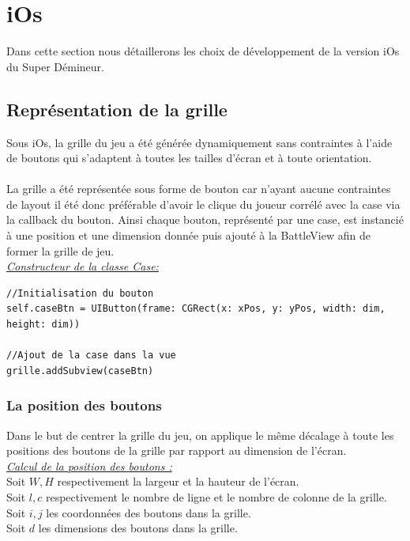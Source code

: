 \documentclass{article}
\begin{document}
\section{iOs}

Dans cette section nous détaillerons les choix de développement de la version iOs du Super Démineur. 

\subsection{Représentation de la grille}

Sous iOs, la grille du jeu a été générée dynamiquement sans contraintes à l'aide de boutons qui s'adaptent à toutes les tailles d'écran et à toute orientation. \\\\
La grille a été représentée sous forme de bouton car n'ayant aucune contraintes de layout il été donc préférable d'avoir le clique du joueur corrélé avec la case via la callback du bouton. 
Ainsi chaque bouton, représenté par une case, est instancié à une position et une dimension donnée puis ajouté à la BattleView afin de former la grille de jeu.\\

\noindent \underline{\textit{Constructeur de la classe Case:}}
\begin{verbatim}
//Initialisation du bouton
self.caseBtn = UIButton(frame: CGRect(x: xPos, y: yPos, width: dim, height: dim)) 

//Ajout de la case dans la vue
grille.addSubview(caseBtn)
\end{verbatim}


\subsubsection{La position des boutons}

Dans le but de centrer la grille du jeu, on applique le même décalage à toute les positions des boutons de la grille par rapport au dimension de l'écran.\\

\noindent \underline{\textit{Calcul de la position des boutons :}}\\
Soit $W,H$ respectivement la largeur et la hauteur de l'écran. \\
Soit $l,c$ respectivement le nombre de ligne et le nombre de colonne de la grille. \\
Soit $i,j$ les coordonnées  des boutons dans la grille. \\
Soit $d$ les dimensions des boutons dans la grille. \\
\end{document}
